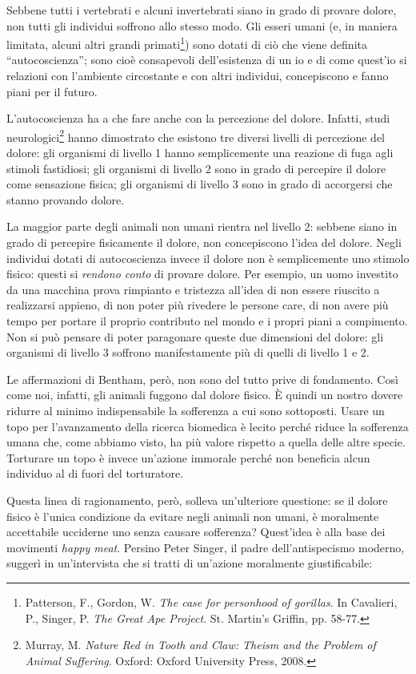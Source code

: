 \documentclass[a4paper,11pt,oneside,article]{memoir}
\begin{document}
Sebbene tutti i vertebrati e alcuni invertebrati siano in grado di provare
dolore, non tutti gli individui soffrono allo stesso modo. Gli esseri umani (e,
in maniera limitata, alcuni altri grandi primati\footnote{Patterson, F., Gordon,
W. \emph{The case for personhood of gorillas}. In Cavalieri, P., Singer, P.
\emph{The Great Ape Project}. St. Martin's Griffin, pp. 58-77.}) sono dotati di
ciò che viene definita ``autocoscienza''; sono cioè consapevoli dell'esistenza
di un io e di come quest'io si relazioni con l'ambiente circostante e con altri
individui, concepiscono e fanno piani per il futuro.

L'autocoscienza ha a che fare anche con la percezione del dolore. Infatti, studi
neurologici\footnote{Murray, M. \emph{Nature Red in Tooth and Claw: Theism and
the Problem of Animal Suffering}. Oxford: Oxford University Press, 2008.} hanno
dimostrato che esistono tre diversi livelli di percezione del dolore: gli
organismi di livello 1 hanno semplicemente una reazione di fuga agli stimoli
fastidiosi; gli organismi di livello 2 sono in grado di percepire il dolore come
sensazione fisica; gli organismi di livello 3 sono in grado di accorgersi che
stanno provando dolore.

La maggior parte degli animali non umani rientra nel livello 2: sebbene siano in
grado di percepire fisicamente il dolore, non concepiscono l'idea del dolore.
Negli individui dotati di autocoscienza invece il dolore non è semplicemente uno
stimolo fisico: questi si \emph{rendono conto} di provare dolore. Per esempio,
un uomo investito da una macchina prova rimpianto e tristezza all'idea di non
essere riuscito a realizzarsi appieno, di non poter più rivedere le persone
care, di non avere più tempo per portare il proprio contributo nel mondo e i
propri piani a compimento. Non si può pensare di poter paragonare queste due
dimensioni del dolore: gli organismi di livello 3 soffrono manifestamente più
di quelli di livello 1 e 2.

Le affermazioni di Bentham, però, non sono del tutto prive di fondamento. Così
come noi, infatti, gli animali fuggono dal dolore fisico. È quindi un nostro
dovere ridurre al minimo indispensabile la sofferenza a cui sono sottoposti.
Usare un topo per l'avanzamento della ricerca biomedica è lecito perché riduce
la sofferenza umana che, come abbiamo visto, ha più valore rispetto a quella
delle altre specie. Torturare un topo è invece un'azione immorale perché non
beneficia alcun individuo al di fuori del torturatore.

Questa linea di ragionamento, però, solleva un'ulteriore questione: se il dolore
fisico è l'unica condizione da evitare negli animali non umani, è moralmente
accettabile ucciderne uno senza causare sofferenza? Quest'idea è alla base dei
movimenti \emph{happy meat}. Persino Peter Singer, il padre dell'antispecismo
moderno, suggerì in un'intervista che si tratti di un'azione moralmente
giustificabile:
\end{document}
